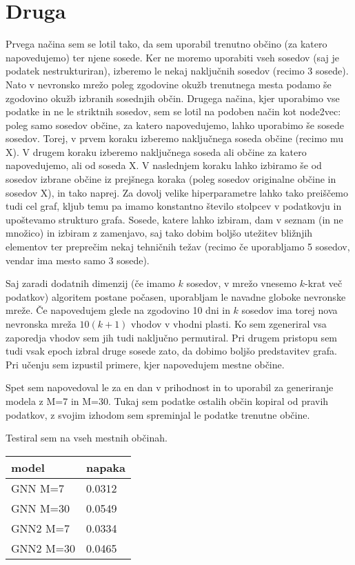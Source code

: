 \documentclass{article}
\begin{document}
\section{Druga} 
Prvega načina sem se lotil tako, da sem uporabil trenutno občino (za katero napovedujemo) ter njene sosede. Ker ne moremo uporabiti vseh sosedov (saj je podatek nestrukturiran), izberemo le nekaj naključnih sosedov (recimo 3 sosede). Nato v nevronsko mrežo poleg zgodovine okužb trenutnega mesta podamo še zgodovino okužb izbranih sosednjih občin. Drugega načina, kjer uporabimo vse podatke in ne le striktnih sosedov, sem se lotil na podoben način kot node2vec: poleg samo sosedov občine, za katero napovedujemo, lahko uporabimo še sosede sosedov. Torej, v prvem koraku izberemo naključnega soseda občine (recimo mu X). V drugem koraku izberemo naključnega soseda ali občine za katero napovedujemo, ali od soseda X. V naslednjem koraku lahko izbiramo še od sosedov izbrane občine iz prejšnega koraka (poleg sosedov originalne občine in sosedov X), in tako naprej. Za dovolj velike hiperparametre lahko tako preiščemo tudi cel graf, kljub temu pa imamo konstantno število stolpcev v podatkovju in upoštevamo strukturo grafa. Sosede, katere lahko izbiram, dam v seznam (in ne množico) in izbiram z zamenjavo, saj tako dobim boljšo utežitev bližnjih elementov ter preprečim nekaj tehničnih težav (recimo če uporabljamo 5 sosedov, vendar ima mesto samo 3 sosede).

Saj zaradi dodatnih dimenzij (če imamo \(k\) sosedov, v mrežo vnesemo \(k\)-krat več podatkov) algoritem postane počasen, uporabljam le navadne globoke nevronske mreže. Če napovedujem glede na zgodovino 10 dni in \(k\) sosedov ima torej nova nevronska mreža \(10(k+1)\) vhodov v vhodni plasti. Ko sem zgeneriral vsa zaporedja vhodov sem jih tudi naključno permutiral. Pri drugem pristopu sem tudi vsak epoch izbral druge sosede zato, da dobimo boljšo predstavitev grafa. Pri učenju sem izpustil primere, kjer napovedujem mestne občine.

Spet sem napovedoval le za en dan v prihodnost in to uporabil za generiranje modela z M=7 in M=30. Tukaj sem podatke ostalih občin kopiral od pravih podatkov, z svojim izhodom sem spreminjal le podatke trenutne občine.

Testiral sem na vseh mestnih občinah.


\begin{table}[]
    \begin{tabular}{@{}ll@{}}
    \toprule
    model     & napaka \\ \midrule
    GNN M=7   & 0.0312 \\
    GNN M=30  & 0.0549 \\
    GNN2 M=7  & 0.0334 \\
    GNN2 M=30 & 0.0465
    \end{tabular}
    \end{table}
\end{document}
